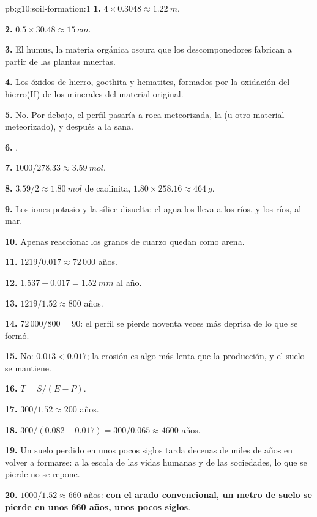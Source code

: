 \begin{solution}{pb:g10:soil-formation:1}
\textbf{1.} $4 \times 0.3048 \approx \qty{1.22}{m}$.

\textbf{2.} $0.5 \times 30.48 \approx \qty{15}{cm}$.

\textbf{3.} El humus, la materia orgánica oscura que los descomponedores
fabrican a partir de las plantas muertas.

\textbf{4.} Los óxidos de hierro, goethita y hematites, formados por la
oxidación del hierro(II) de los minerales del material original.

\textbf{5.} No. Por debajo, el perfil pasaría a roca meteorizada, la
 (u otro material meteorizado), y después a la  sana.

\textbf{6.} .

\textbf{7.} $1000/278.33 \approx \qty{3.59}{mol}$.

\textbf{8.} $3.59/2 \approx \qty{1.80}{mol}$ de caolinita, $1.80 \times 258.16
\approx \qty{464}{g}$.

\textbf{9.} Los iones potasio y la sílice disuelta: el agua los lleva a los
ríos, y los ríos, al mar.

\textbf{10.} Apenas reacciona: los granos de cuarzo quedan como arena.

\textbf{11.} $1219/0.017 \approx 72\,000$ años.

\textbf{12.} $1.537 - 0.017 = \qty{1.52}{mm}$ al año.

\textbf{13.} $1219/1.52 \approx 800$ años.

\textbf{14.} $72\,000/800 = 90$: el perfil se pierde noventa veces más
deprisa de lo que se formó.

\textbf{15.} No: $0.013 < 0.017$; la erosión es algo más lenta que la
producción, y el suelo se mantiene.

\textbf{16.} $T = S/(E - P)$.

\textbf{17.} $300/1.52 \approx 200$ años.

\textbf{18.} $300/(0.082 - 0.017) = 300/0.065 \approx 4600$ años.

\textbf{19.} Un suelo perdido en unos pocos siglos tarda decenas de miles de
años en volver a formarse: a la escala de las vidas humanas y de las
sociedades, lo que se pierde no se repone.

\textbf{20.} $1000/1.52 \approx 660$ años: \textbf{con el arado convencional,
un metro de suelo se pierde en unos 660 años, unos pocos siglos}.
\end{solution}
